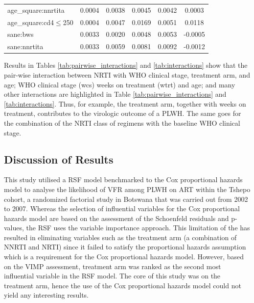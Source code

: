 \documentclass[10pt]{NSP1}
\begin{document}
\begin{table}[t]
\begin{tabular}{@{}lccccc@{}}
        age\_square:nnrtita & 0.0004 & 0.0038 & 0.0045 & 0.0042 & 0.0003 \\
        age\_square:cd4$\leq$250 & 0.0004 & 0.0047 & 0.0169 & 0.0051 & 0.0118 \\
        sane:bws            & 0.0033 & 0.0020 & 0.0048 & 0.0053 & -0.0005 \\
        sane:nnrtita        & 0.0033 & 0.0059 & 0.0081 & 0.0092& -0.0012\\ %
        \bottomrule
    \end{tabular}
\end{table}

Results in Tables \ref{tab:pairwise_interactions} and \ref{tab:interactions} show that the pair-wise interaction between NRTI with WHO clinical stage, treatment arm, and age; WHO clinical stage (wcs) weeks on treatment (wtrt) and age; and many other interactions are highlighted in Table \ref{tab:pairwise_interactions} and \ref{tab:interactions}. Thus, for example, the treatment arm, together with weeks on treatment, contributes to the virologic outcome of a PLWH. The same goes for the combination of the NRTI class of regimens with the baseline WHO clinical stage.

\subsection{ Discussion of Results}
This study utilised a RSF model benchmarked to the Cox proportional hazards model to analyse the likelihood of VFR among PLWH on ART within the Tshepo cohort, a randomized factorial study in Botswana that was carried out from 2002 to 2007. Whereas the selection of influential variables for the Cox proportional hazards model are based on the assessment of the Schoenfeld residuals and p-values, the RSF uses the variable importance approach. This limitation of the has resulted in eliminating variables such as the treatment arm (a combination of NNRTI and NRTI) since it failed to satisfy the proportional hazards assumption which is a requirement for the Cox proportional hazards model. However, based on the VIMP assessment, treatment arm was ranked as the second most influential variable in the RSF model. The core of this study was on the treatment arm, hence the use of the Cox proportional hazards model could not yield any interesting results.
\end{document}
